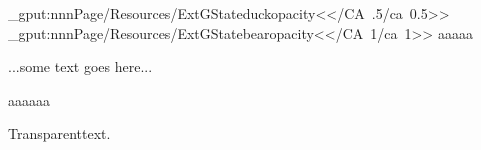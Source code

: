 \documentclass{article}
\begin{document}
\ExplSyntaxOn
\pdfcoredict_gput:nnn{Page/Resources/ExtGState}{duckopacity}{<</CA~.5/ca~0.5>>}
\pdfcoredict_gput:nnn{Page/Resources/ExtGState}{bearopacity}{<</CA~1/ca~1>>}
\ExplSyntaxOff
aaaaa
...some text goes here...
aaaaaa
   Transparent\newpage text.
%
\end{document}
